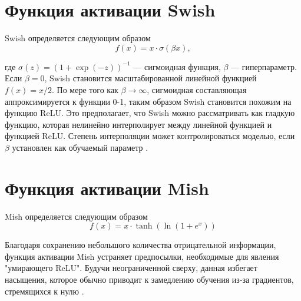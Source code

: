 	
	
\section {Функция активации Swish}
	Swish определяется следующим образом
	\begin{equation}
		f(x) = x \cdot \sigma(\beta x),
	\end{equation}
	
	где $\sigma(z) = (1 + \exp(-z))^{-1}$ — сигмоидная функция, $\beta$ — гиперпараметр.\newline
	Если $\beta = 0$, Swish становится масштабированной линейной функцией $f(x) = x/2$. По мере того как $\beta \to \infty$, сигмоидная составляющая аппроксимируется к функции 0-1, таким образом Swish становится похожим на функцию ReLU. Это предполагает, что Swish можно рассматривать как гладкую функцию, которая нелинейно интерполирует между линейной функцией и функцией ReLU. Степень интерполяции может контролироваться моделью, если $\beta$ установлен как обучаемый параметр \cite{survey, berkeley}.
	
	
	
	
\section {Функция активации Mish}
	Mish определяется следующим образом
	\begin{equation}
		f(x) = x \cdot \tanh(\ln(1 + e^x))
	\end{equation}
	
	Благодаря сохранению небольшого количества отрицательной информации, функция активации Mish устраняет предпосылки, необходимые для явления "умирающего ReLU". Будучи неограниченной сверху, данная избегает насыщения, которое обычно приводит к замедлению обучения из-за градиентов, стремящихся к нулю \cite{survey, sparsecnn}.
	
	
